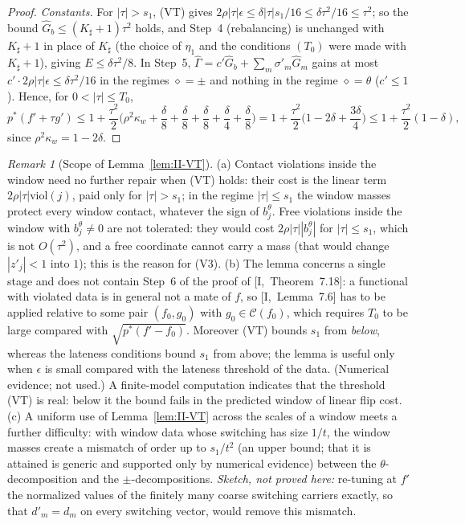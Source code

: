 \documentclass[10pt]{amsart}
\theoremstyle{definition}
\theoremstyle{remark}
\newtheorem{remark}[theorem]{Remark}
\newcommand{\Cset}{\mathcal C}
\begin{document}
\begin{proof}
\emph{Constants.}  For $|\tau|>s_1$, (VT) gives $2\rho|\tau|\epsilon\le\delta
|\tau|s_1/16\le\delta\tau^2/16\le\tau^2$; so the bound $\hat G_b\le(K_\sharp+1)
\tau^2$ holds, and Step~4 (rebalancing) is unchanged with $K_\sharp+1$ in
place of $K_\sharp$ (the choice of $\eta_1$ and the conditions $(T_0)$ were
made with $K_\sharp+1$), giving $E\le\delta\tau^2/8$.  In Step~5,
$\hat\Gamma=c'\hat G_b+\sum_m\sigma'_m\hat G_m$ gains at most $c'\cdot2\rho
|\tau|\epsilon\le\delta\tau^2/16$ in the regimes $\diamond=\pm$ and nothing in
the regime $\diamond=\theta$ ($c'\le1$).  Hence, for $0<|\tau|\le T_0$,
\[
 p^*(f'+\tau g')\le1+\frac{\tau^2}2\Big(\rho^2\kappa_w+\frac\delta8+
 \frac\delta8+\frac\delta8+\frac\delta4+\frac\delta8\Big)=1+\frac{\tau^2}2
 \Big(1-2\delta+\frac{3\delta}4\Big)\le1+\frac{\tau^2}2(1-\delta),
\]
since $\rho^2\kappa_w=1-2\delta$.
\end{proof}

\begin{remark}[Scope of Lemma~\ref{lem:II-VT}]\label{rem:II-VT}
(a) Contact violations inside the window need no further repair when (VT)
holds: their cost is the linear term $2\rho|\tau|\mathrm{viol}(j)$, paid only
for $|\tau|>s_1$; in the regime $|\tau|\le s_1$ the window masses protect every
window contact, whatever the sign of $b^\theta_j$.  Free violations inside
the window with $b^\theta_j\ne0$ are not tolerated: they would cost
$2\rho|\tau||b^\theta_j|$ for $|\tau|\le s_1$, which is not $O(\tau^2)$, and a
free coordinate cannot carry a mass (that would change $|z'_j|<1$ into
$1$); this is the reason for (V3).
(b) The lemma concerns a single stage and does not contain Step~6 of the
proof of [I,~Theorem~7.18]: a functional with violated data is in general not
a mate of $f$, so [I,~Lemma~7.6] has to be applied relative to some pair
$(f_0,g_0)$ with $g_0\in\Cset(f_0)$, which requires $T_0$ to be large compared
with $\sqrt{p^*(f'-f_0)}$.  Moreover (VT) bounds $s_1$ from \emph{below},
whereas the lateness conditions bound $s_1$ from above; the lemma is useful
only when $\epsilon$ is small compared with the lateness threshold of the
data.  (Numerical evidence; not used.)  A finite-model computation
indicates that the threshold (VT) is real: below it the bound fails in the
predicted window of linear flip cost.
(c) A uniform use of Lemma~\ref{lem:II-VT} across the scales of a window
meets a further difficulty: with window data whose switching has size $1/t$,
the window masses create a mismatch of order up to $s_1/t^2$ (an upper
bound; that it is attained is generic and supported only by numerical
evidence) between the
$\theta$-decomposition and the $\pm$-decompositions.  \emph{Sketch, not
proved here:} re-tuning at $f'$ the normalized values of the finitely many
coarse switching carriers exactly, so that $d'_m=d_m$ on every switching
vector, would remove this mismatch.
\end{remark}
\end{document}
